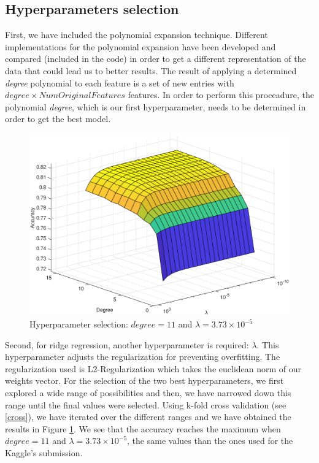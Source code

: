 \documentclass[10pt,conference,compsocconf]{IEEEtran}
\begin{document}
\subsection{Hyperparameters selection}
 First, we have included the polynomial expansion technique. Different implementations for the polynomial expansion have been developed and compared (included in the code) in order to get a different representation of the data that could lead us to better results. The result of applying a determined \textit{degree} polynomial to each feature is a set of new entries with $degree\times Num Original Features$ features. In order to perform this proceadure, the polynomial \textit{degree}, which is our first hyperparameter, needs to be determined in order to get the best model.
 
 \begin{figure}
  \centering
   \includegraphics[scale=0.3]{acc.eps} 
  \caption[c]{\protect\label{fig:hyper}Hyperparameter selection: $degree=11$ and $\lambda=3.73\times10^{-5}$}
  \setlength{\belowcaptionskip}{-1pt}
\end{figure}
Second, for ridge regression, another hyperparameter is required:  $\lambda$. This hyperparameter adjusts the regularization for preventing overfitting. The regularization used is L2-Regularization which takes the euclidean norm of our weights vector. For the selection of the two best  hyperparameters, we first explored a wide range of possibilities and then, we have narrowed down this range until the final values were selected. Using k-fold cross validation (see \ref{cross}), we have iterated over the different ranges and we have obtained the results in Figure \ref{fig:hyper}. We see that the accuracy reaches the maximum when $degree=11$ and $\lambda=3.73\times10^{-5}$, the same values than the ones used for the Kaggle's submission. 
\end{document}
